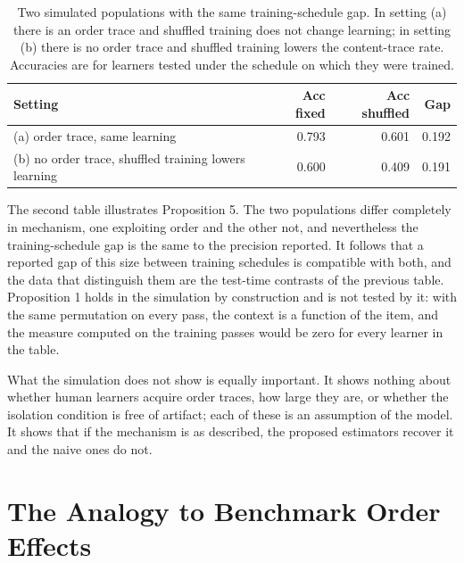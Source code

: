 \documentclass[11pt]{article}
\theoremstyle{remark}
\begin{document}
\begin{table}[ht]
\centering
\small
\begin{tabular}{lrrr}
\toprule
Setting & Acc fixed & Acc shuffled & Gap \\
\midrule
(a) order trace, same learning & 0.793 & 0.601 & 0.192 \\
(b) no order trace, shuffled training lowers learning & 0.600 & 0.409 & 0.191 \\
\bottomrule
\end{tabular}
\caption{Two simulated populations with the same training-schedule gap. In setting (a) there is an order trace and shuffled training does not change learning; in setting (b) there is no order trace and shuffled training lowers the content-trace rate. Accuracies are for learners tested under the schedule on which they were trained.}
\end{table}

The second table illustrates Proposition 5. The two populations differ completely in mechanism, one exploiting order and the other not, and nevertheless the training-schedule gap is the same to the precision reported. It follows that a reported gap of this size between training schedules is compatible with both, and the data that distinguish them are the test-time contrasts of the previous table. Proposition 1 holds in the simulation by construction and is not tested by it: with the same permutation on every pass, the context is a function of the item, and the measure computed on the training passes would be zero for every learner in the table.

What the simulation does not show is equally important. It shows nothing about whether human learners acquire order traces, how large they are, or whether the isolation condition is free of artifact; each of these is an assumption of the model. It shows that if the mechanism is as described, the proposed estimators recover it and the naive ones do not.

\section{The Analogy to Benchmark Order Effects}
\end{document}
